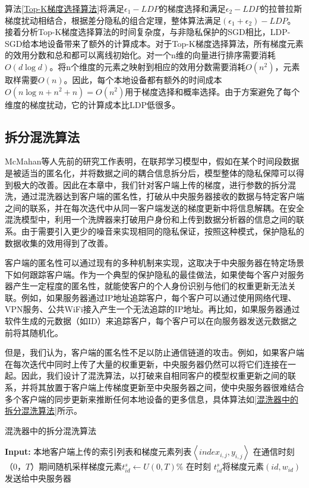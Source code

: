 算法\ref{Top-K梯度选择算法}将满足$\epsilon_{1}-LDP$的梯度选择和满足$\epsilon_{2}-LDP$的拉普拉斯梯度扰动相结合，根据差分隐私的组合定理，整体算法满足$\left(\epsilon_{1}+\epsilon_{2}\right)-LDP$。
接着分析Top-K梯度选择算法的时间复杂度，与非隐私保护的SGD相比，LDP-SGD给本地设备带来了额外的计算成本。对于Top-K梯度选择算法，所有梯度元素的效用分数和总和都可以离线初始化。对一个n维的向量进行排序需要消耗 $O(d \log d)$。将n个维度的元素之映射到相应的效用分数需要消耗$O\left(n^{2}\right)$，元素取样需要$O(n)$。因此，每个本地设备都有额外的时间成本$O\left(n \log n+n^{2}+n\right)=O\left(n^{2}\right)$用于梯度选择和概率选择。由于方案避免了每个维度的梯度扰动，它的计算成本比LDP低很多。

\subsection{拆分混洗算法}
McMahan等人先前的研究工作表明，在联邦学习模型中，假如在某个时间段数据是被适当的匿名化，并将数据之间的耦合信息拆分后，模型整体的隐私保障可以得到极{}大的改善。因此在本章中，我们针对客户端上传的梯度，进行参数的拆分混洗，通过混洗器达到客户端的匿名性，打破从中央服务器接收的数据与特定客户端之间的联系，并在每次迭代中从同一客户端发送的梯度更新中将信息解耦。在安全混洗模型中，利用一个洗牌器来打破用户身份和上传到数据分析器的信息之间的联系。由于需要引入更少的噪音来实现相同的隐私保证，按照这种模式，保护隐私的数据收集的效用得到了改善。

客户端的匿名性可以通过现有的多种机制来实现，这取决于中央服务器在特定场景下如何跟踪客户端。作为一个典型的保护隐私的最佳做法，如果使每个客户对服务器产生一定程度的匿名性，就能使客户的个人身份识别与他们的权重更新无法关联。例如，如果服务器通过IP地址追踪客户，每个客户可以通过使用网络代理、VPN服务、公共WiFi接入产生一个无法追踪的IP地址。再比如，如果服务器通过软件生成的元数据（如ID）来追踪客户，每个客户可以在向服务器发送元数据之前将其随机化。

但是，我们认为，客户端的匿名性不足以防止通信链道的攻击。例如，如果客户端在每次迭代中同时上传了大量的权重更新，中央服务器仍然可以将它们连接在一起。因此，我们设计了混洗算法，以打破来自相同客户的模型权重更新之间的联系，并将其放置于客户端上传梯度更新至中央服务器之间，使中央服务器很难结合多个客户端的同步更新来推断任何本地设备的更多信息，具体算法如\ref{混洗器中的拆分混洗算法}所示。

\begin{algorithm}[!htb]
	\caption{混洗器中的拆分混洗算法}
	\label{混洗器中的拆分混洗算法}
	\begin{algorithmic}[1]
		\footnotesize
		\STATE \textbf{Input:} 本地客户端上传的索引列表和梯度元素列表$\left\langle index_{i,j}, y_{i,j}\right\rangle$
	    \STATE 在通信时刻（0，$T$）期间随机采样梯度元素$t_{i d}^{s} \leftarrow U(0, T) \%$
	    \ENDFOR
	    \STATE 在时刻 $t_{i d}^{s}$将梯度元素$(i d, w_{i d})$发送给中央服务器
	\end{algorithmic}
\end{algorithm}

